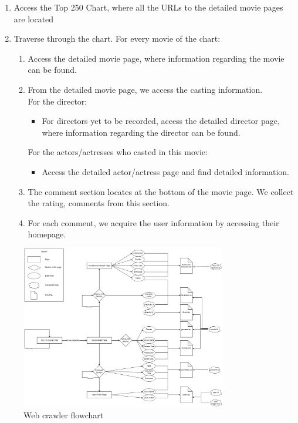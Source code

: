 \begin{CJK*}{UTF8}{gbsn}
\begin{enumerate}
    \item Access the Top 250 Chart, where all the URLs to the detailed movie pages are located
    \item Traverse through the chart. For every movie of the chart:
    \begin{enumerate}
        \item Access the detailed movie page, where information regarding the movie can be found.
        \item From the detailed movie page, we access the casting information.\\ For the director:
        \begin{itemize}
            \item For directors yet to be recorded, access the detailed director page, where information regarding the director can be found.
        \end{itemize}
        For the actors/actresses who casted in this movie:
        \begin{itemize}
            \item Access the detailed actor/actress page and find detailed information.
        \end{itemize}
        \item The comment section locates at the bottom of the movie page. We collect the rating, comments from this section.
        \item For each comment, we acquire the user information by accessing their homepage.
    \end{enumerate}
\end{enumerate}

\begin{figure}[h]
    \label{crawler}
    \centering
    \includegraphics[width=0.8\textwidth]{crawler_flowchart.png}
    \caption{Web crawler flowchart}
\end{figure}


\end{CJK*}
